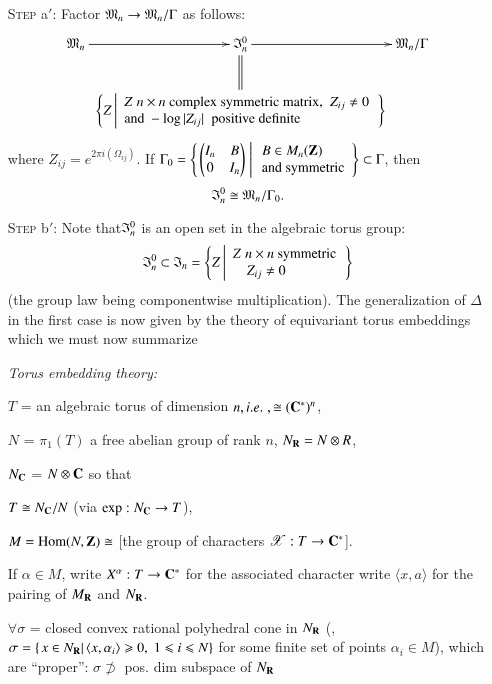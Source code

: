 \begin{itemize}
\item[\textsc{Step} a$'$:] Factor $\mathfrak{M}_n \to \mathfrak{M}_n / \Gamma$ as follows:
$$
\xymatrix@C=0.05cm{
\fM_n \ar[r]  &\fI^0_n \ar@{=}[d] \ar[r] &  \fM_n / \Gamma\\
& \left\{ Z  \left| 
\begin{array}{l}
Z \; n \times n \text{ complex symmetric matrix, } \; Z_{ij} \neq 0 \tabularnewline
\text{and } -\log |Z_{ij}| \; \text{ positive definite}
\end{array} 
\right.
\right\} & 
}
$$
where $Z_{ij} = e^{2\pi i(\Omega_{ij})}$. If $\Gamma_0 = \left\{ \left. \begin{pmatrix}I_n & B \\ 0 & I_n \end{pmatrix}\; \right| 
\begin{array}{l}
B \in M_n (\mathbf{Z})\\
\text{and symmetric}
\end{array}
 \right\} \subset \Gamma$, then
$$
\mathfrak{I}^0_n \cong \mathfrak{M}_n /\Gamma_0.
$$

\item[\textsc{Step} b$'$:] Note that\pageoriginale $\mathfrak{I}^0_n$ is an open set in the algebraic torus group:
$$
\mathfrak{I}^0_n \subset \mathfrak{I}_n = 
\left\{Z \left|\begin{array}{l}
Z \; n \times n \text{ symmetric}\\
\quad Z_{ij} \neq 0
\end{array}
\right. \right\}
$$
(the group law being componentwise multiplication). The generalization of $\Delta$ in the first case is now given by the theory of equivariant torus embeddings which we must now summarize

\noindent
\textit{Torus embedding theory:}

$T$ = an algebraic torus of dimension $n, {i.e.}\kern.3em, \cong (\mathbf{C}^\ast)^n$,

$N$ = $\pi_1 (T)$ a free abelian group of rank $n$, $N_{\mathbf{R}} = N\otimes R$, 

$N_{\mathbf{C}}$ = $N \otimes \mathbf{C}$ so that 

$T \cong N_{\mathbf{C}} / N$ (via $\exp : N_{\mathbf{C}} \to T$),

$M = \operatorname{Hom} (N , \mathbf{Z}) \cong$ [the group of characters $\mathscr{X}: T \to \mathbf{C}^\ast$].

If $\alpha \in M$, write $X^\alpha: T \to \mathbf{C}^\ast$ for the associated character write $\langle x, a\rangle$ for the pairing of $M_{\mathbf{R}}$ and $N_{\mathbf{R}}$.

$\forall \sigma$ = closed convex rational polyhedral cone in $N_{\mathbf{R}}$ (\ie, $\sigma = \{\left. x \in N_{\mathbf{R}} \right| \langle x, \alpha_i \rangle \geqslant 0, \; 1 \leqslant i \leqslant N\}$ for some finite set of points $\alpha_i \in M$), which are ``proper'': $\sigma \not\supset$ pos. dim subspace of $N_{\mathbf{R}}$


\end{itemize}
